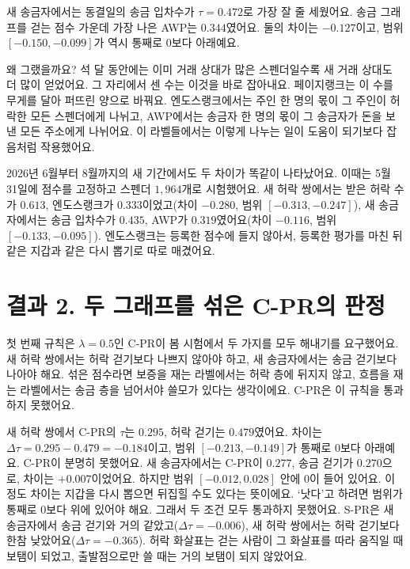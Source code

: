 새 송금자에서는 동결일의 송금 입차수가 $\tau=0.472$로 가장 잘 줄 세웠어요. 송금 그래프를 걷는 점수 가운데 가장 나은 AWP는 $0.344$였어요. 둘의 차이는 $-0.127$이고, 범위 $[-0.150,-0.099]$가 역시 통째로 0보다 아래예요.

왜 그랬을까요? 석 달 동안에는 이미 거래 상대가 많은 스펜더일수록 새 거래 상대도 더 많이 얻었어요. 그 자리에서 센 수는 이것을 바로 잡아내요. 페이지랭크는 이 수를 무게를 달아 퍼뜨린 양으로 바꿔요. 엔도스랭크에서는 주인 한 명의 몫이 그 주인이 허락한 모든 스펜더에게 나뉘고, AWP에서는 송금자 한 명의 몫이 그 송금자가 돈을 보낸 모든 주소에게 나뉘어요. 이 라벨들에서는 이렇게 나누는 일이 도움이 되기보다 잡음처럼 작용했어요.

2026년 6월부터 8월까지의 새 기간에서도 두 차이가 똑같이 나타났어요. 이때는 5월 31일에 점수를 고정하고 스펜더 $1{,}964$개로 시험했어요. 새 허락 쌍에서는 받은 허락 수가 $0.613$, 엔도스랭크가 $0.333$이었고(차이 $-0.280$, 범위 $[-0.313,-0.247]$), 새 송금자에서는 송금 입차수가 $0.435$, AWP가 $0.319$였어요(차이 $-0.116$, 범위 $[-0.133,-0.095]$). 엔도스랭크는 등록한 점수에 들지 않아서, 등록한 평가를 마친 뒤 같은 지갑과 같은 다시 뽑기로 따로 매겼어요.

\section*{결과 2. 두 그래프를 섞은 C-PR의 판정}

첫 번째 규칙은 $\lambda=0.5$인 C-PR이 봄 시험에서 두 가지를 모두 해내기를 요구했어요. 새 허락 쌍에서는 허락 걷기보다 나쁘지 않아야 하고, 새 송금자에서는 송금 걷기보다 나아야 해요. 섞은 점수라면 보증을 재는 라벨에서는 허락 층에 뒤지지 않고, 흐름을 재는 라벨에서는 송금 층을 넘어서야 쓸모가 있다는 생각이에요. C-PR은 이 규칙을 통과하지 못했어요.

새 허락 쌍에서 C-PR의 $\tau$는 $0.295$, 허락 걷기는 $0.479$였어요. 차이는 $\Delta\tau=0.295-0.479=-0.184$이고, 범위 $[-0.213,-0.149]$가 통째로 0보다 아래예요. C-PR이 분명히 못했어요. 새 송금자에서는 C-PR이 $0.277$, 송금 걷기가 $0.270$으로, 차이는 $+0.007$이었어요. 하지만 범위 $[-0.012,0.028]$ 안에 0이 들어 있어요. 이 정도 차이는 지갑을 다시 뽑으면 뒤집힐 수도 있다는 뜻이에요. ‘낫다’고 하려면 범위가 통째로 0보다 위에 있어야 해요. 그래서 두 조건 모두 통과하지 못했어요. S-PR은 새 송금자에서 송금 걷기와 거의 같았고($\Delta\tau=-0.006$), 새 허락 쌍에서는 허락 걷기보다 한참 낮았어요($\Delta\tau=-0.365$). 허락 화살표는 걷는 사람이 그 화살표를 따라 움직일 때 보탬이 되었고, 출발점으로만 쓸 때는 거의 보탬이 되지 않았어요.

